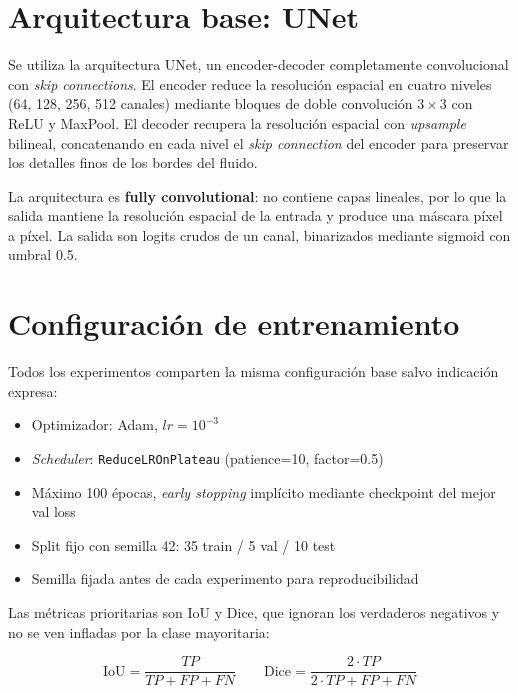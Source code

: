\documentclass[12pt,a4paper]{article}
\begin{document}
\section{Arquitectura base: UNet}

Se utiliza la arquitectura UNet, un encoder-decoder completamente convolucional con \textit{skip connections}. El encoder reduce la resolución espacial en cuatro niveles (64, 128, 256, 512 canales) mediante bloques de doble convolución $3\times3$ con ReLU y MaxPool. El decoder recupera la resolución espacial con \textit{upsample} bilineal, concatenando en cada nivel el \textit{skip connection} del encoder para preservar los detalles finos de los bordes del fluido.

La arquitectura es \textbf{fully convolutional}: no contiene capas lineales, por lo que la salida mantiene la resolución espacial de la entrada y produce una máscara píxel a píxel. La salida son logits crudos de un canal, binarizados mediante sigmoid con umbral 0.5.

\section{Configuración de entrenamiento}

Todos los experimentos comparten la misma configuración base salvo indicación expresa:

\begin{itemize}
    \item Optimizador: Adam, $lr = 10^{-3}$
    \item \textit{Scheduler}: \texttt{ReduceLROnPlateau} (patience=10, factor=0.5)
    \item Máximo 100 épocas, \textit{early stopping} implícito mediante checkpoint del mejor val loss
    \item Split fijo con semilla 42: 35 train / 5 val / 10 test
    \item Semilla fijada antes de cada experimento para reproducibilidad
\end{itemize}

Las métricas prioritarias son IoU y Dice, que ignoran los verdaderos negativos y no se ven infladas por la clase mayoritaria:

\begin{equation}
    \text{IoU} = \frac{TP}{TP + FP + FN}
    \qquad
    \text{Dice} = \frac{2 \cdot TP}{2 \cdot TP + FP + FN}
\end{equation}
\end{document}
